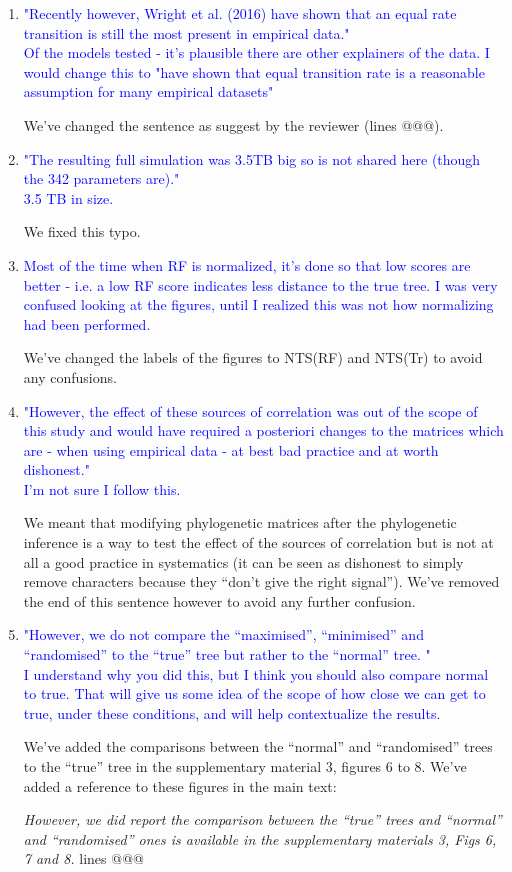 \documentclass[12pt,letterpaper]{article}
\begin{document}
\begin{enumerate}

\item{\textcolor{blue}{"Recently however, Wright et al. (2016) have shown that an equal rate transition is still the most present in empirical data."\\
Of the models tested - it's plausible there are other explainers of the data. I would change this to "have shown that equal transition rate is a reasonable assumption for many empirical datasets"}}

We've changed the sentence as suggest by the reviewer (lines @@@).

\item{\textcolor{blue}{"The resulting full simulation was 3.5TB big so is not shared here (though the 342 parameters are)."\\
3.5 TB in size.}}

We fixed this typo.

\item{\textcolor{blue}{Most of the time when RF is normalized, it's done so that low scores are better - i.e. a low RF score indicates less distance to the true tree. I was very confused looking at the figures, until I realized this was not how normalizing had been performed. }}

We've changed the labels of the figures to NTS(RF) and NTS(Tr) to avoid any confusions.

\item{\textcolor{blue}{"However, the effect of these sources of correlation was out of the scope of this study and would have required a posteriori changes to the matrices which are - when using empirical data - at best bad practice and at worth dishonest."\\
I'm not sure I follow this.}}
\label{dishonest}

We meant that modifying phylogenetic matrices after the phylogenetic inference is a way to test the effect of the sources of correlation but is not at all a good practice in systematics (it can be seen as dishonest to simply remove characters because they ``don't give the right signal''). We've removed the end of this sentence however to avoid any further confusion.

\item{\textcolor{blue}{"However, we do not compare the ``maximised'', ``minimised'' and ``randomised'' to the ``true'' tree but rather to the ``normal'' tree. "\\
I understand why you did this, but I think you should also compare normal to true. That will give us some idea of the scope of how close we can get to true, under these conditions, and will help contextualize the results.}}

We've added the comparisons between the ``normal'' and ``randomised'' trees to the ``true'' tree in the supplementary material 3, figures 6 to 8.
We've added a reference to these figures in the main text:

\textit{However, we did report the comparison between the ``true'' trees and ``normal'' and ``randomised'' ones is available in the supplementary materials 3, Figs 6, 7 and 8.} lines @@@

\end{enumerate}
\end{document}
